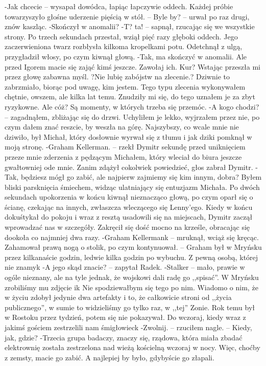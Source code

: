 \documentclass[../MAIN.tex]{subfiles}
\begin{document}
-Jak chcecie -- wysapał dowódca, łapiąc łapczywie oddech. Każdej próbie towarzyszyło głośne uderzenie pięścią w stół. -- Byle by? -- urwał po raz drugi, znów kaszląc.
-Skończył w anomalii?
-T? ta! -- sapnął, rzucając się we wszystkie strony. Po trzech sekundach przestał, wziął pięć razy głęboki oddech. Jego zaczerwieniona twarz rozbłysła kilkoma kropelkami potu. Odetchnął z ulgą, przygładził włosy, po czym kiwnął głową.
-Tak, ma skończyć w anomalii. Ale przed Igorem macie się zająć kimś jeszcze. Zawołaj ich.
Kur?
Wstając przeszła mi przez głowę zabawna myśl.
?Nie lubię zabójstw na zlecenie.? Dziwnie to zabrzmiało, biorąc pod uwagę, kim jestem. Tego typu zlecenia wykonywałem chętnie, owszem, ale kilka lat temu. Znudziły mi się, do tego uznałem je za zbyt ryzykowne.
Ale cóż? Są momenty, w których trzeba się przemóc.
-A kogo chodzi? -- zagadnąłem, zbliżając się do drzwi. Uchyliłem je lekko, wyjrzałem przez nie, po czym dałem znać reszcie, by weszła na górę. Najszybszy, co wcale mnie nie dziwiło, był Michał, który dosłownie wyrwał się z tłumu i jak dziki pomknął w moją stronę.
-Graham Kellerman. -- rzekł Dymitr sekundę przed uniknięciem przeze mnie zderzenia z pędzącym Michałem, który wleciał do biura jeszcze gwałtowniej ode mnie. Zanim zdążył cokolwiek powiedzieć, głos zabrał Dymitr.
-Tak, będziesz mógł go zabić, ale najpierw zajmiemy się kim innym, dobra?
Byłem bliski parsknięcia śmiechem, widząc ulatniający się entuzjazm Michała. Po dwóch sekundach upokorzenia w końcu kiwnął nieznacząco głową, po czym oparł się o ścianę, czekając na innych, zwłaszcza wleczącego się Lenny’ego.
Kiedy w końcu dokuśtykał do pokoju i wraz z resztą usadowili się na miejscach, Dymitr zaczął wprowadzać nas w szczegóły.
Zakręcił się dość mocno na krześle, obracając się dookoła co najmniej dwa razy.
-Graham Kellerman\3k -- mruknął, wciąż się kręcąc. Zahamował prawą nogą o stolik, po czym kontynuował. -- Graham był w Mryńsku przez kilkanaście godzin, ledwie kilka godzin po wybuchu. Z pewną osobą, której nie znamy\3k
-A jego skąd znacie? -- zapytał Radek.
-Stalker -- mało, prawie w ogóle nieznany, ale na tyle jednak, że wojskowi dali radę go ,,spisać''. W Mryńsku zrobiliśmy mu zdjęcie i\3k Nie spodziewałbym się tego po nim. Wiadomo o nim, że w życiu zdobył jedynie dwa artefakty i to, że całkowicie stroni od ,,życia publicznego'', w sumie to widzieliśmy go tylko raz, w ,,tej'' Zonie. Rok temu był w Rostoku przez tydzień, potem się nie pokazywał. Do wczoraj, kiedy wraz z jakimś gościem zestrzelili nam śmigłowiec\3k
-Zwolnij. -- rzuciłem nagle. -- Kiedy, jak, gdzie?
-Trzecia grupa badaczy, znaczy się, rządowa, która miała zbadać elektrownię została zestrzelona nad wieżą kościelną wczoraj w nocy. Więc, choćby z zemsty, macie go zabić. A najlepiej by było, gdybyście go złapali.
\end{document}
